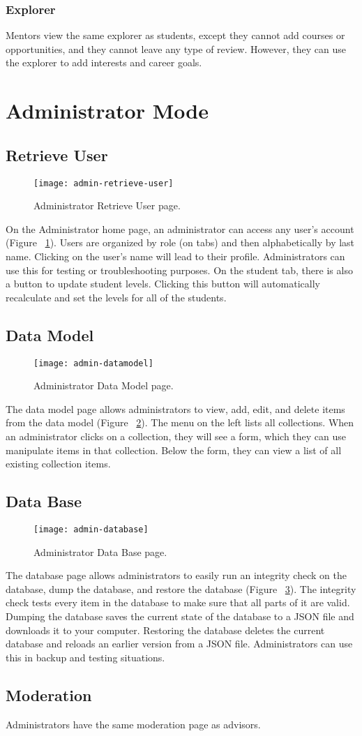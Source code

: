 \subsubsection{Explorer}
Mentors view the same explorer as students, except they cannot add courses or opportunities, and they cannot leave any type of review. However, they can use the explorer to add interests and career goals.

\section{Administrator Mode}
\subsection{Retrieve User}
\begin{figure}[htbp!]
\centering
\texttt{[image: admin-retrieve-user]}
\caption{Administrator Retrieve User page.}
\label{admin-retrieve-user}
\end{figure}
On the Administrator home page, an administrator can access any user's account (Figure ~\ref{admin-retrieve-user}). Users are organized by role (on tabs) and then alphabetically by last name. Clicking on the user's name will lead to their profile. Administrators can use this for testing or troubleshooting purposes. On the student tab, there is also a button to update student levels. Clicking this button will automatically recalculate and set the levels for all of the students.

\subsection{Data Model}
\begin{figure}[htbp!]
\centering
\texttt{[image: admin-datamodel]}
\caption{Administrator Data Model page.}
\label{admin-datamodel}
\end{figure}
The data model page allows administrators to view, add, edit, and delete items from the data model (Figure ~\ref{admin-datamodel}). The menu on the left lists all collections. When an administrator clicks on a collection, they will see a form, which they can use manipulate items in that collection. Below the form, they can view a list of all existing collection items. 
\subsection{Data Base}
\begin{figure}[htbp!]
\centering
\texttt{[image: admin-database]}
\caption{Administrator Data Base page.}
\label{admin-database}
\end{figure}
The database page allows administrators to easily run an integrity check on the database, dump the database, and restore the database (Figure ~\ref{admin-database}). The integrity check tests every item in the database to make sure that all parts of it are valid. Dumping the database saves the current state of the database to a JSON file and downloads it to your computer. Restoring the database deletes the current database and reloads an earlier version from a JSON file. Administrators can use this in backup and testing situations.
\subsection{Moderation}
Administrators have the same moderation page as advisors. 